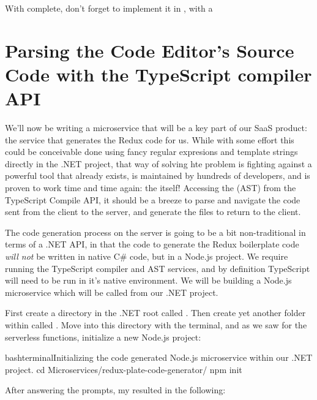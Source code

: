 \documentclass[paper=6in:9in,pagesize=pdftex,headinclude=on,footinclude=on,12pt,twoside]{scrbook}
\begin{document}
With  complete, don't forget to implement it in , with a 

\section{Parsing the Code Editor's Source Code with the TypeScript compiler API}

We'll now be writing a microservice that will be a key part of our SaaS product: the service that generates the Redux code for us. While with some effort this could be conceivable done using fancy regular expresions and template strings directly in the .NET project, that way of solving hte problem is fighting against a powerful tool that already exists, is maintained by hundreds of developers, and is proven to work time and time again: the  itself! Accessing the  (AST) from the TypeScript Compile API, it should be a breeze to parse and navigate the code sent from the client to the server, and generate the files to return to the client.


The code generation process on the server is going to be a bit non-traditional in terms of a .NET API, in that the code to generate the Redux boilerplate code \textit{will not} be written in native C\# code, but in a Node.js project. We require running the TypeScript compiler and AST services, and by definition TypeScript will need to be run in it's native environment. We will be building a Node.js microservice which will be called from our .NET project.


First create a directory in the .NET root called . Then create yet another folder within  called . Move into this directory with the terminal, and as we saw for the serverless functions, initialize a new Node.js project:

\begin{codeInput}{bash}{terminal}{Initializing the code generated Node.js microservice within our .NET project.}
cd Microservices/redux-plate-code-generator/
npm init
\end{codeInput}

After answering the prompts, my  resulted in the following:
\end{document}
